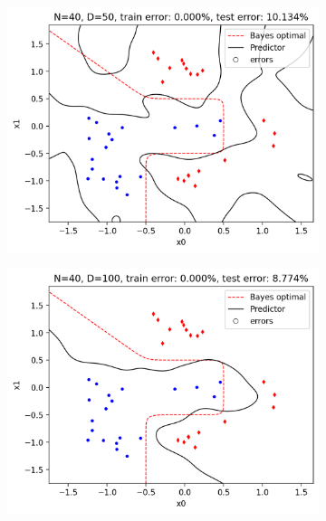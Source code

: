 \documentclass[a4paper,11pt]{article}
\begin{document}
\begin{figure}[ht]
\begin{subfigure}[b]{0.3\textwidth}
        \includegraphics[width=\textwidth]{../boundary/50.png}
    \end{subfigure}
    \hfill
    \begin{subfigure}[b]{0.3\textwidth}
        \includegraphics[width=\textwidth]{../boundary/100.png}
    \end{subfigure}
    \begin{subfigure}[b]{0.3\textwidth}

\end{subfigure}
\end{figure}
\end{document}
